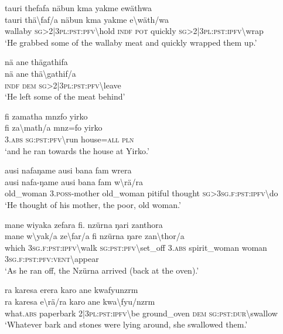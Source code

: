 \ea\label{ex:8:a1745}
tauri thefafa näbun kma yakme ewäthwa\\
\gll tauri	thä{\textbackslash}faf/a	näbun	kma	yakme	e{\textbackslash}wäth/wa\\
     wallaby	\textsc{sg}>2|3\textsc{pl}:\textsc{pst}:\textsc{pfv}{\textbackslash}hold	\textsc{indf}	\textsc{pot}	quickly	\textsc{sg}>2|3\textsc{pl}:\textsc{pst}:\textsc{ipfv}{\textbackslash}wrap\\
\glt `He grabbed some of the wallaby meat and quickly wrapped them up.'
\z

\ea\label{ex:8:a1746}
nä ane thägathifa\\
\gll nä	ane	thä{\textbackslash}gathif/a\\
     \textsc{indf}	\textsc{dem}	\textsc{sg}>2|3\textsc{pl}:\textsc{pst}:\textsc{pfv}{\textbackslash}leave\\
\glt `He left some of the meat behind'
\z

\ea\label{ex:8:a1747}
fi zamatha mnzfo yirko\\
\gll fi	za{\textbackslash}math/a	mnz=fo	yirko\\
     3.\textsc{abs}	\textsc{sg}:\textsc{pst}:\textsc{pfv}{\textbackslash}run	house=\textsc{all}	\textsc{pln}\\
\glt `and he ran towards the house at Yirko.'
\z

\newpage
\ea\label{ex:8:a1749}
ausi nafaŋame ausi bana fam wrera\\
\gll ausi	nafa-ŋame	ausi	bana	fam	w{\textbackslash}rä/ra\\
     old\_woman	3.\textsc{poss}-mother	old\_woman	pitiful	thought	\textsc{sg}>3\textsc{sg}.\textsc{f}:\textsc{pst}:\textsc{ipfv}{\textbackslash}do\\
\glt `He thought of his mother, the poor, old woman.'
\z

\ea\label{ex:8:a1750}
mane wiyaka zefara fi. nzürna ŋari zanthora\\
\gll mane	w{\textbackslash}yak/a	ze{\textbackslash}far/a	fi	nzürna	ŋare	zan{\textbackslash}thor/a\\
     which	3\textsc{sg}.\textsc{f}:\textsc{pst}:\textsc{ipfv}{\textbackslash}walk	\textsc{sg}:\textsc{pst}:\textsc{pfv}{\textbackslash}set\_off	3.\textsc{abs}	spirit\_woman	woman	3\textsc{sg}.\textsc{f}:\textsc{pst}:\textsc{pfv}:\textsc{vent}{\textbackslash}appear\\
\glt `As he ran off, the Nzürna arrived (back at the oven).'
\z

\ea\label{ex:8:a1752}
ra karesa erera karo ane kwafyunzrm\\
\gll ra	karesa	e{\textbackslash}rä/ra	karo	ane	kwa{\textbackslash}fyu/nzrm\\
     what.\textsc{abs}	paperbark	2|3\textsc{pl}:\textsc{pst}:\textsc{ipfv}{\textbackslash}be	ground\_oven	\textsc{dem}	\textsc{sg}:\textsc{pst}:\textsc{dur}{\textbackslash}swallow\\
\glt `Whatever bark and stones were lying around, she swallowed them.'
\z

